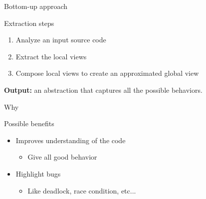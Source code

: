 \documentclass{beamer}
\begin{document}
\begin{frame}{Bottom-up approach}
\begin{block}{Extraction steps}
\begin{enumerate}
  \item Analyze an input source code
  \item Extract the local views
  \item Compose local views to create an approximated global view
\end{enumerate}
\end{block}
\textbf{Output:} an abstraction that captures all the possible behaviors.
\end{frame}


\begin{frame}{Why}
\begin{block}{Possible benefits}
\begin{itemize}
  \item Improves understanding of the code
  \begin{itemize}
    \item Give all good behavior
  \end{itemize}
  \item Highlight bugs
  \begin{itemize}
    \item Like deadlock, race condition, etc...
  \end{itemize}
\end{itemize}
\end{block}
\end{frame}
\end{document}
